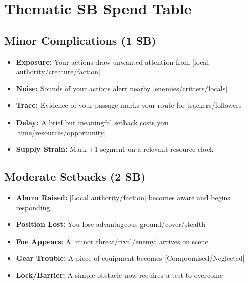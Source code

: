 
\section*{Thematic SB Spend Table}
\label{sec:thematic-sb}

\subsection*{Minor Complications (1 SB)}
\begin{itemize}
\item \textbf{Exposure:} Your actions draw unwanted attention from [local authority/creature/faction]
\item \textbf{Noise:} Sounds of your actions alert nearby [enemies/critters/locals]
\item \textbf{Trace:} Evidence of your passage marks your route for trackers/followers
\item \textbf{Delay:} A brief but meaningful setback costs you [time/resources/opportunity]
\item \textbf{Supply Strain:} Mark +1 segment on a relevant resource clock
\end{itemize}

\subsection*{Moderate Setbacks (2 SB)}
\begin{itemize}
\item \textbf{Alarm Raised:} [Local authority/faction] becomes aware and begins responding
\item \textbf{Position Lost:} You lose advantageous ground/cover/stealth
\item \textbf{Foe Appears:} A [minor threat/rival/enemy] arrives on scene
\item \textbf{Gear Trouble:} A piece of equipment becomes [Compromised/Neglected]
\item \textbf{Lock/Barrier:} A simple obstacle now requires a test to overcome
\end{itemize}

